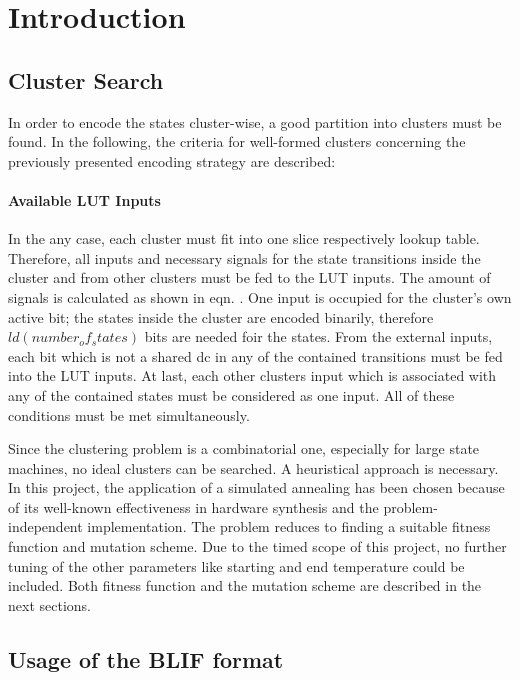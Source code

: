 \chapter{Introduction}
\label{cha:introduction}





\section{Cluster Search}
\label{sec:clusterSearch}

In order to encode the states cluster-wise, a good partition into clusters must be found. In the following, the criteria for well-formed 
clusters concerning the previously presented encoding strategy are described:

\subsubsection{Available LUT Inputs}
\label{subsubsec:LUTInputs}
In the any case, each cluster must fit into one slice respectively lookup table. Therefore, all inputs and necessary signals for the state 
transitions inside the cluster and from other clusters must be fed to the LUT inputs. The amount of signals is calculated as shown in eqn. 
\label{eqn:formula}. One input is occupied for the cluster's own active bit; the states inside the cluster are encoded binarily, therefore 
$ld(number_of_states)$ bits are needed foir the states. From the external inputs, each bit which is not a shared dc in any of the contained
transitions must be fed into the LUT inputs. At last, each other clusters input which is associated with any of the contained states must 
be considered as one input. All of these conditions must be met simultaneously.

Since the clustering problem is a combinatorial one, especially for large state machines, no ideal clusters can be searched. A heuristical 
approach is necessary. In this project, the application of a simulated annealing has been chosen because of its well-known effectiveness in
hardware synthesis and the problem-independent implementation. The problem reduces to finding a suitable fitness function and mutation scheme.
Due to the timed scope of this project, no further tuning of the other parameters like starting and end temperature could be included. Both 
fitness function and the mutation scheme are described in the next sections.

\section{Usage of the BLIF format}
\label{subsubsec:UsageBLIF}

